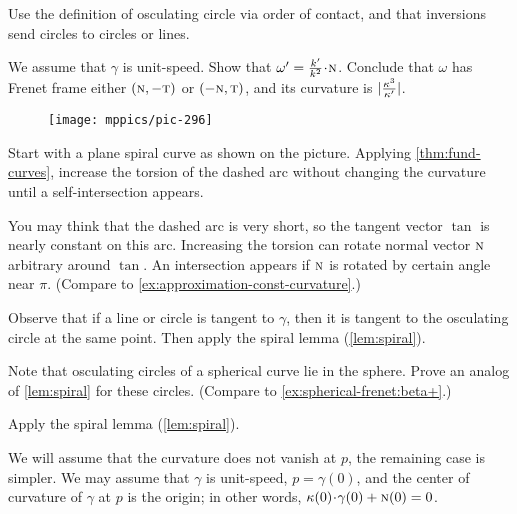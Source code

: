 \begin{multicols}{2}
Use the definition of osculating circle via order of contact, and that inversions send circles to circles or lines. 

We assume that $\gamma$ is unit-speed.
Show that $\omega'=\tfrac{\skur'}{\skur^2}\cdot \norm$. 
Conclude that $\omega$ has Frenet frame either $(\text{\sc{n}},-\text{\sc{t}})$ or $(-\text{\sc{n}},\text{\sc{t}})$, and its curvature is $|\tfrac{\kappa^3}{\kappa'}|$.

\begin{wrapfigure}{r}{19 mm}
\vskip-4mm
\centering
\texttt{[image: mppics/pic-296]}
\vskip-0mm
\end{wrapfigure}

Start with a plane spiral curve as shown on the picture.
Applying \ref{thm:fund-curves}, increase the torsion of the dashed arc without changing the curvature until a self-intersection appears.

You may think that the dashed arc is very short, so the tangent vector $\tan$ is nearly constant on this arc. 
Increasing the torsion can rotate normal vector $\text{\sc{n}}$ arbitrary around $\tan$.
An intersection appears if $\text{\sc{n}}$ is rotated by certain angle near $\pi$.
(Compare to \ref{ex:approximation-const-curvature}.)

Observe that if a line or circle is tangent to $\gamma$,
then it is tangent to the osculating circle at the same point.
Then apply the spiral lemma (\ref{lem:spiral}).

Note that osculating circles of a spherical curve lie in the sphere.
Prove an analog of \ref{lem:spiral} for these circles.
(Compare to \ref{ex:spherical-frenet:beta+}.)



\setcounter{eqtn}{0}

Apply the spiral lemma (\ref{lem:spiral}).

We will assume that the curvature does not vanish at $p$, the remaining case is simpler.
We may assume that $\gamma$ is unit-speed, $p=\gamma(0)$,
and the center of curvature of $\gamma$ at $p$ is the origin;
in other words, $\kur(0)\cdot\gamma(0)+ \norm(0)=0$.


\end{multicols}
